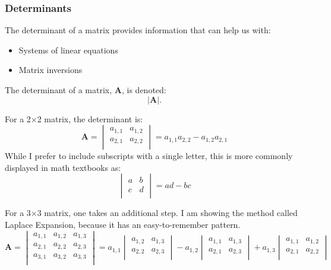 \documentclass[a4paper,10pt]{scrartcl}
\begin{document}
\subsubsection{Determinants}

The determinant of a matrix provides information that can help us with:
\begin{itemize}
 \item Systems of linear equations
 \item Matrix inversions
\end{itemize}

The determinant of a matrix, $\mathbf{A}$, is denoted:
\begin{equation}
 |\mathbf{A}|.
\end{equation}

For a 2$\times$2 matrix, the determinant is:
\begin{equation}
 \mathbf{A} = 
 \begin{vmatrix}
  a_{1,1} & a_{1,2} \\
  a_{2,1} & a_{2,2} \\
 \end{vmatrix}
 = a_{1,1} a_{2,2} - a_{1,2} a_{2,1}
\end{equation}
While I prefer to include subscripts with a single letter, this is more commonly displayed in math textbooks as:
\begin{equation}
 \begin{vmatrix}
  a & b \\
  c & d \\
 \end{vmatrix}
 = a d - b c
\end{equation}

For a 3$\times$3 matrix, one takes an additional step. I am showing the method called Laplace Expansion, because it has an easy-to-remember pattern.
\begin{equation}
 \mathbf{A} = 
 \begin{vmatrix}
  a_{1,1} & a_{1,2} & a_{1,3} \\
  a_{2,1} & a_{2,2} & a_{2,3} \\
  a_{3,1} & a_{3,2} & a_{3,3} \\
 \end{vmatrix}
 = a_{1,1}
 \begin{vmatrix}
  a_{1,2} & a_{1,3} \\
  a_{2,2} & a_{2,3} \\
 \end{vmatrix}
- a_{1,2}
 \begin{vmatrix}
  a_{1,1} & a_{1,3} \\
  a_{2,1} & a_{2,3} \\
 \end{vmatrix}
+ a_{1,3}
 \begin{vmatrix}
  a_{1,1} & a_{1,2} \\
  a_{2,1} & a_{2,2} \\
 \end{vmatrix}
\end{equation}
 
\end{document}
